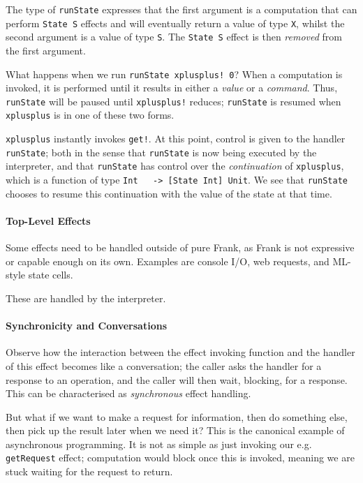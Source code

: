 \documentclass[msc,deptreport,cs]{infthesis} %
\newcommand{\code}[1]{\lstinline{#1}}
\begin{document}
\noindent The type of \code{runState} expresses that the first argument is a
computation that can perform \code{State S} effects and will eventually return a
value of type \code{X}, whilst the second argument is a value of type \code{S}.
The \code{State S} effect is then \emph{removed} from the first argument.

What happens when we run \code{runState xplusplus! 0}? When a computation is
invoked, it is performed until it results in either a \emph{value} or a
\emph{command}. Thus, \code{runState} will be paused until \code{xplusplus!}
reduces; \code{runState} is resumed when \code{xplusplus} is in one of these two
forms.

\code{xplusplus} instantly invokes \code{get!}. At this point, control is given
to the handler \code{runState}; both in the sense that \code{runState} is now
being executed by the interpreter, and that \code{runState} has control over the
\emph{continuation} of \code{xplusplus}, which is a function of type \code{Int
  -> [State Int] Unit}. We see that \code{runState} chooses to resume this
continuation with the value of the state at that time.

\paragraph*{Top-Level Effects}
Some effects need to be handled outside of pure Frank, as Frank is not
expressive or capable enough on its own. Examples are console I/O, web requests,
and ML-style state cells.

These are handled by the interpreter.

\paragraph*{Synchronicity and Conversations}
Observe how the interaction between the effect invoking function and the handler
of this effect becomes like a conversation; the caller asks the handler for a
response to an operation, and the caller will then wait, blocking, for a
response. This can be characterised as \emph{synchronous} effect handling.

But what if we want to make a request for information, then do something else,
then pick up the result later when we need it? This is the canonical example of
asynchronous programming. It is not as simple as just invoking our e.g.
\code{getRequest} effect; computation would block once this is invoked, meaning
we are stuck waiting for the request to return.
\end{document}
